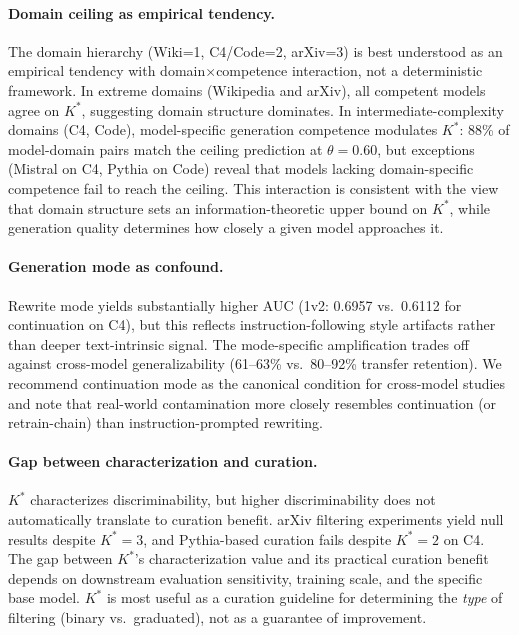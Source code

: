\documentclass[11pt,a4paper]{article}
\begin{document}
\paragraph{Domain ceiling as empirical tendency.}
The domain hierarchy (Wiki=1, C4/Code=2, arXiv=3) is best understood as an empirical tendency with domain$\times$competence interaction, not a deterministic framework. In extreme domains (Wikipedia and arXiv), all competent models agree on $K^*$, suggesting domain structure dominates. In intermediate-complexity domains (C4, Code), model-specific generation competence modulates $K^*$: 88\% of model-domain pairs match the ceiling prediction at $\theta = 0.60$, but exceptions (Mistral on C4, Pythia on Code) reveal that models lacking domain-specific competence fail to reach the ceiling. This interaction is consistent with the view that domain structure sets an information-theoretic upper bound on $K^*$, while generation quality determines how closely a given model approaches it.

\paragraph{Generation mode as confound.}
Rewrite mode yields substantially higher AUC (1v2: 0.6957 vs.\ 0.6112 for continuation on C4), but this reflects instruction-following style artifacts rather than deeper text-intrinsic signal. The mode-specific amplification trades off against cross-model generalizability (61--63\% vs.\ 80--92\% transfer retention). We recommend continuation mode as the canonical condition for cross-model studies and note that real-world contamination more closely resembles continuation (or retrain-chain) than instruction-prompted rewriting.

\paragraph{Gap between characterization and curation.}
$K^*$ characterizes discriminability, but higher discriminability does not automatically translate to curation benefit. arXiv filtering experiments yield null results despite $K^*\!=\!3$, and Pythia-based curation fails despite $K^*\!=\!2$ on C4. The gap between $K^*$'s characterization value and its practical curation benefit depends on downstream evaluation sensitivity, training scale, and the specific base model. $K^*$ is most useful as a curation guideline for determining the \emph{type} of filtering (binary vs.\ graduated), not as a guarantee of improvement.
\end{document}
